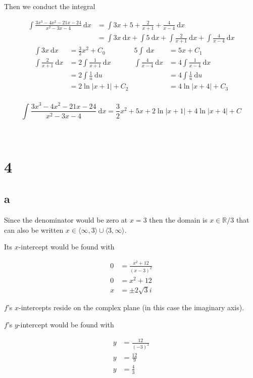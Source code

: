 \documentclass{article}
\newcommand{\md}{~\mathrm d}
\newcommand{\blankpage}{
    \newpage
    \
    \newpage
}
\begin{document}
Then we conduct the integral

\begin{align*}
    \int\frac{3 x^3 - 4 x^2 - 21 x - 24}{x ^ 2 - 3  x - 4} \md x
         &= \int3x + 5 + \frac2{x+1} + \frac4{x-4} \md x\\
         &= \int3x\md x + \int5\md x + \int \frac2{x+1}\md x + \int\frac4{x-4} \md x
\end{align*}
\begin{align*}
    \int3x\md x &= \frac 32 x^2 + C_0 &
    5\int\md x  &= 5 x + C_1 \\
    \int \frac2{x+1}\md x &= 2 \int \frac1{x+1}\md x &
    \int \frac4{x-4}\md x &= 4 \int \frac1{x-4}\md x \\
                          &= 2 \int \frac1u\md u &
                          &= 4 \int \frac1{u}\md u \\
                          &= 2 \ln {|x+1|} + C_2 &
                          &= 4 \ln {|x+4|} + C_3 \\
\end{align*}

$$
\int\frac{3 x^3 - 4 x^2 - 21 x - 24}{x ^ 2 - 3  x - 4} \md x =
\frac 32 x^2 + 5x + 2 \ln {|x+1|} + 4 \ln {|x+4|} + C
$$

\blankpage
\section{4}
\subsection{a}

Since the denominator would be zero at $x = 3$ then the domain is $x\in\mathbb R /3$ that can also be written $x\in\langle\infty,3\rangle\cup\langle3,\infty\rangle$.

Its $x$-intercept would be found with

\begin{align*}
    0 &= \frac{x^2 + 12}{(x-3)^2} \\
    0 &= x^2 + 12 \\
    x &= \pm 2\sqrt{3}i
\end{align*}

$f$'s $x$-intercepts reside on the complex plane (in this case the imaginary axis).

$f$'s $y$-intercept would be found with

\begin{align*}
    y &= \frac{12}{(-3)^2} \\
    y &= \frac{12}{9} \\
    y &= \frac{4}{3} \\
\end{align*}
\end{document}
